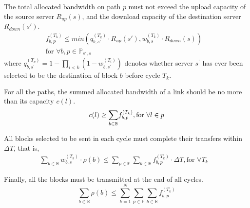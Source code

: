 \begin{packeditemize}
\item The total allocated bandwidth on path $p$ must not exceed the
upload capacity of
the source server $R_{up}(s)$, and the download capacity of the
destination server $R_{down}(s')$.
\begin{equation}
\begin{split}
f^{(T_k)}_{b,p} \leq min\left(%
q_{b,s'}^{(T_k)}\cdot R_{up}(s'),
w_{b,s}^{(T_k)}\cdot R_{down}(s)\right) &\\
\text{for }\forall b, p\in \mathbb{P}_{s',s} &
\end{split}
\end{equation}
where $q_{b,s^\prime}^{(T_k)} = 1-\prod_{i<k} (1-w_{b,s^\prime}^{(T_i)})$ denotes
whether server $s^\prime$ has ever been selected to be the destination of
block $b$ before cycle $T_k$.

\item For all the paths, the summed allocated bandwidth of a link
should be no more than its capacity $c(l)$.
\begin{equation}
c(l) \geq \displaystyle{\sum_{b \in \mathbb{B}}}
f^{(T_k)}_{b,p},
\text{for }\forall l\in p\\
\end{equation}

\item All blocks selected to be sent in each cycle must complete
their transfers within $\Delta T$, that is,
\begin{equation}
\begin{split}
\displaystyle{\sum_{b \in \mathbb{B}}} w_{b,s}^{(T_k)} \cdot \rho(b)
\leq \displaystyle{\sum_{p\in \mathbb{P}}}
\displaystyle{\sum_{b \in \mathbb{B}}} f^{(T_k)}_{b,p} \cdot
\Delta T,
\text{for }\forall T_k &
\end{split}
\end{equation}


\item Finally, all the blocks must be transmitted at the end of all
cycles.
\begin{equation}
\displaystyle{\sum_{b\in \mathbb{B}}} \rho(b) \leq
\displaystyle{\sum_{k=1}^{N}}
\displaystyle{\sum_{p\in \mathbb{P}}}
\displaystyle{\sum_{b\in \mathbb{B}}}
f_{b,p}^{(T_k)}
\end{equation}
\end{packeditemize}


